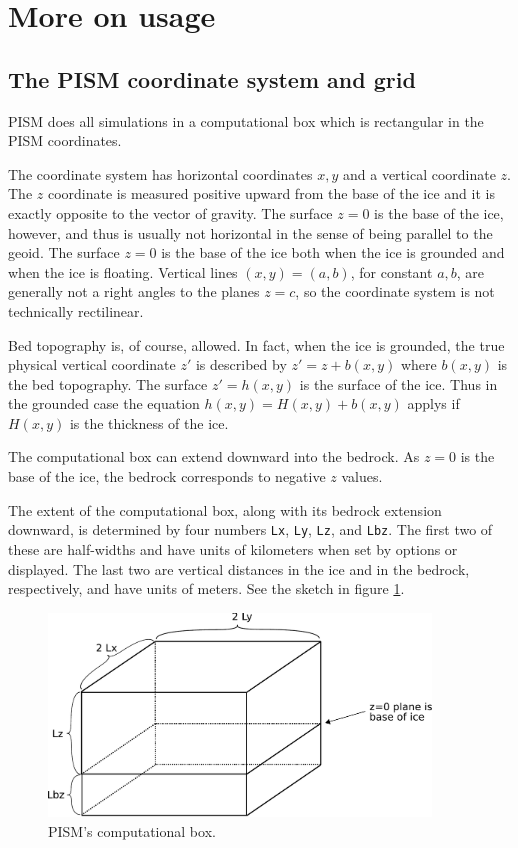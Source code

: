 \documentclass[12pt,final]{amsart}
\renewcommand{\t}[1]{\texttt{#1}}
\begin{document}
\clearpage
\newpage
\section{More on usage}\label{sect:usage}

\subsection{The PISM coordinate system and grid}  PISM does all simulations in a computational box which is rectangular in the PISM coordinates.

The coordinate system has horizontal coordinates $x,y$ and a vertical coordinate $z$.  The $z$ coordinate is measured positive upward from the base of the ice and it is exactly opposite to the vector of gravity.  The surface $z=0$ is the base of the ice, however, and thus is usually not horizontal in the sense of being parallel to the geoid.   The surface $z=0$ is the base of the ice both when the ice is grounded and when the ice is floating.  Vertical lines $(x,y)=(a,b)$, for constant $a,b$, are generally not a right angles to the planes $z=c$, so the coordinate system is not technically rectilinear.

Bed topography is, of course, allowed.  In fact, when the ice is grounded, the true physical vertical coordinate $z'$ is described by $z'=z+b(x,y)$ where $b(x,y)$ is the bed topography.  The surface $z'=h(x,y)$ is the surface of the ice.  Thus in the grounded case the equation $h(x,y)=H(x,y)+b(x,y)$ applys if $H(x,y)$ is the thickness of the ice.

The computational box can extend downward into the bedrock.  As $z=0$ is the base of the ice, the bedrock corresponds to negative $z$ values.

The extent of the computational box, along with its bedrock extension downward, is determined by four numbers \t{Lx}, \t{Ly}, \t{Lz}, and \t{Lbz}.  The first two of these are half-widths and have units of kilometers when set by options or displayed.  The last two are vertical distances in the ice and in the bedrock, respectively, and have units of meters.  See the sketch in figure \ref{fig:rectilinearbox}.

\begin{figure}[ht]
\includegraphics[width=4.0in,keepaspectratio=true]{figs/rectilinearbox}
\caption{PISM's computational box.}
\label{fig:rectilinearbox}
\end{figure}
\end{document}
